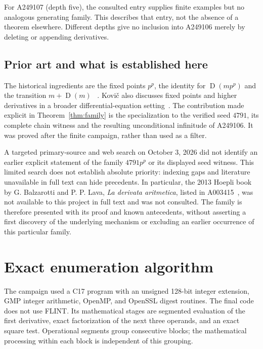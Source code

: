 \documentclass[11pt,a4paper]{article}
\theoremstyle{remark}
\newcommand{\D}{\operatorname{D}}
\begin{document}
For A249107 (depth five), the consulted entry supplies finite examples
but no analogous generating family. This describes that entry, not the
absence of a theorem elsewhere.
Different depths give no inclusion into A249106 merely by deleting or
appending derivatives.

\subsection{Prior art and what is established here}
The historical ingredients are the fixed points $p^p$, the identity
for $\D(mp^p)$ and the transition $m+\D(m)$
~\cite{ufnarovski,derivative,auxiliary}.
Kovi\v{c} also discusses fixed points and higher derivatives in a broader
differential-equation setting~\cite[Sections 1.2 and 2.1]{kovic}.
The contribution made explicit in Theorem~\ref{thm:family} is the
specialization to the verified seed $4791$, its complete chain witness
and the resulting unconditional infinitude of A249106.
It was proved after the finite campaign, rather than used as a filter.

A targeted primary-source and web search on October 3, 2026 did not
identify an earlier explicit statement of the family $4791p^p$ or its
displayed seed witness. This limited search does not establish absolute
priority: indexing gaps and literature unavailable in full text can hide
precedents. In particular, the 2013 Hoepli book by G. Balzarotti and
P. P. Lava, \emph{La derivata aritmetica}, listed in A003415~\cite{derivative},
was not available to this project in full text and was not consulted.
The family is therefore presented with its proof and known
antecedents, without asserting a first discovery of the underlying
mechanism or excluding an earlier occurrence of this particular family.

\section{Exact enumeration algorithm}\label{sec:algorithm}
The campaign used a C17 program with an unsigned 128-bit integer extension,
GMP integer arithmetic, OpenMP, and OpenSSL digest routines. The final code
does not use FLINT. Its mathematical stages are segmented evaluation of the
first derivative, exact factorization of the next three operands, and an
exact square test. Operational segments group consecutive blocks; the
mathematical processing within each block is independent of this grouping.
\end{document}
